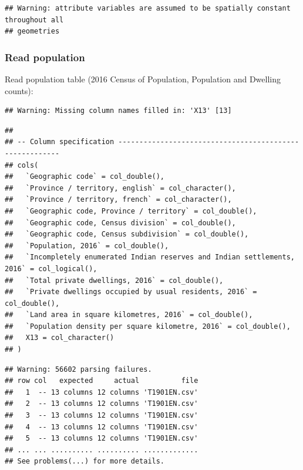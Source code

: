 \documentclass[
]{article}
\newenvironment{Shaded}{\begin{snugshade}}{\end{snugshade}}
\newcommand{\DataTypeTok}[1]{\textcolor[rgb]{0.13,0.29,0.53}{#1}}
\newcommand{\DecValTok}[1]{\textcolor[rgb]{0.00,0.00,0.81}{#1}}
\newcommand{\KeywordTok}[1]{\textcolor[rgb]{0.13,0.29,0.53}{\textbf{#1}}}
\newcommand{\NormalTok}[1]{#1}
\newcommand{\OperatorTok}[1]{\textcolor[rgb]{0.81,0.36,0.00}{\textbf{#1}}}
\newcommand{\StringTok}[1]{\textcolor[rgb]{0.31,0.60,0.02}{#1}}
\begin{document}
\begin{verbatim}
## Warning: attribute variables are assumed to be spatially constant throughout all
## geometries
\end{verbatim}

\hypertarget{read-population}{%
\subsubsection{Read population}\label{read-population}}

Read population table (2016 Census of Population, Population and
Dwelling counts):

\begin{Shaded}
\end{Shaded}

\begin{verbatim}
## Warning: Missing column names filled in: 'X13' [13]
\end{verbatim}

\begin{verbatim}
## 
## -- Column specification --------------------------------------------------------
## cols(
##   `Geographic code` = col_double(),
##   `Province / territory, english` = col_character(),
##   `Province / territory, french` = col_character(),
##   `Geographic code, Province / territory` = col_double(),
##   `Geographic code, Census division` = col_double(),
##   `Geographic code, Census subdivision` = col_double(),
##   `Population, 2016` = col_double(),
##   `Incompletely enumerated Indian reserves and Indian settlements, 2016` = col_logical(),
##   `Total private dwellings, 2016` = col_double(),
##   `Private dwellings occupied by usual residents, 2016` = col_double(),
##   `Land area in square kilometres, 2016` = col_double(),
##   `Population density per square kilometre, 2016` = col_double(),
##   X13 = col_character()
## )
\end{verbatim}

\begin{verbatim}
## Warning: 56602 parsing failures.
## row col   expected     actual          file
##   1  -- 13 columns 12 columns 'T1901EN.csv'
##   2  -- 13 columns 12 columns 'T1901EN.csv'
##   3  -- 13 columns 12 columns 'T1901EN.csv'
##   4  -- 13 columns 12 columns 'T1901EN.csv'
##   5  -- 13 columns 12 columns 'T1901EN.csv'
## ... ... .......... .......... .............
## See problems(...) for more details.
\end{verbatim}
\end{document}
